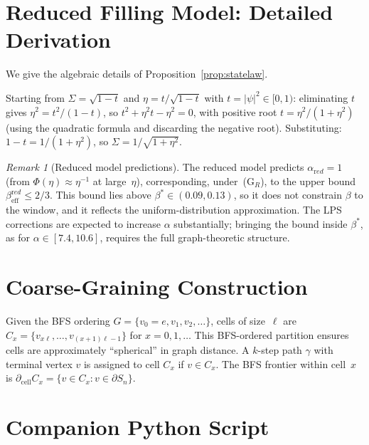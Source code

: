 \documentclass[11pt,a4paper]{article}
\theoremstyle{definition}
\theoremstyle{remark}
\newtheorem{remark}[theorem]{Remark}
\newcommand{\beff}{\beta_{\mathrm{eff}}}
\begin{document}
  \appendix

  \section{Reduced Filling Model: Detailed Derivation}
  \label{app:reduced}


  We give the algebraic details of Proposition~\ref{prop:statelaw}.

  Starting from $\Sigma = \sqrt{1-t}$ and $\eta = t/\sqrt{1-t}$ with $t = |\psi|^2 \in [0,1)$:
  eliminating $t$ gives $\eta^2 = t^2/(1-t)$, so $t^2 + \eta^2 t - \eta^2 = 0$,
  with positive root $t = \eta^2/(1+\eta^2)$
  (using the quadratic formula and discarding the negative root).
  Substituting: $1-t = 1/(1+\eta^2)$, so $\Sigma = 1/\sqrt{1+\eta^2}$.

  \begin{remark}[Reduced model predictions]
    \label{rem:reduced-predictions}
    The reduced model predicts $\alpha_{\mathrm red} = 1$ (from $\Phi(\eta) \approx \eta^{-1}$ at large~$\eta$),
    corresponding, under~(G$_R$), to the upper bound $\beff^{\mathrm red} \leq 2/3$.
    This bound lies above $\beta^* \in (0.09, 0.13)$, so it does not constrain $\beta$ to the window, and
    it reflects the uniform-distribution approximation.
    The LPS corrections are expected to increase $\alpha$ substantially; bringing the bound inside
    $\beta^*$, as for $\alpha \in [7.4, 10.6]$, requires the full graph-theoretic structure.
  \end{remark}

  \section{Coarse-Graining Construction}
  \label{app:coarse}


  Given the BFS ordering $G = \{v_0 = e, v_1, v_2, \ldots\}$,
  cells of size~$\ell$ are $C_x = \{v_{x\ell}, \ldots, v_{(x+1)\ell-1}\}$ for $x = 0,1,\ldots$
  This BFS-ordered partition ensures cells are approximately ``spherical'' in graph distance.
  A $k$-step path $\gamma$ with terminal vertex $v$ is assigned to cell $C_x$ if $v \in C_x$.
  The BFS frontier within cell~$x$ is $\partial_{\mathrm{cell}} C_x = \{v \in C_x : v \in \partial S_n\}$.

  \section{Companion Python Script}
  \label{app:python}
\end{document}
